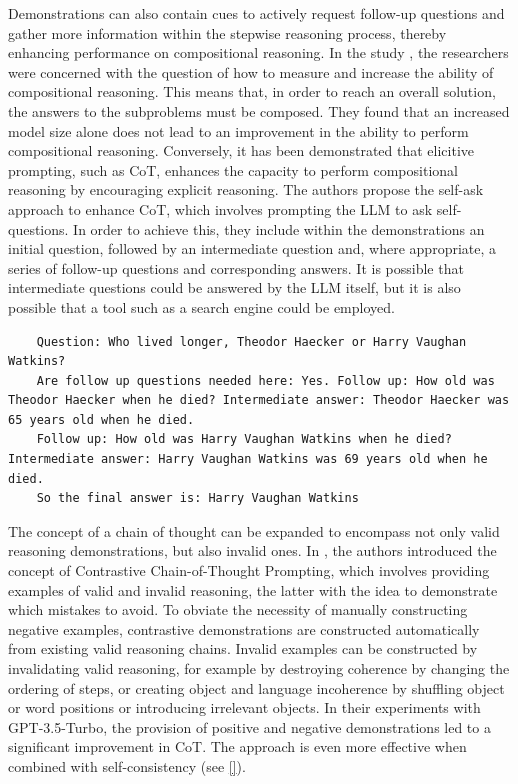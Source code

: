 \documentclass{article}
\begin{document}
Demonstrations can also contain cues to actively request follow-up questions and gather more information within the stepwise reasoning process, thereby enhancing performance on compositional reasoning. 
In the study \cite{press_measuring_2023}, the researchers were concerned with the question of how to measure and increase the ability of compositional reasoning. This means that, in order to reach an overall solution, the answers to the subproblems must be composed. They found that an increased model size alone does not lead to an improvement in the ability to perform compositional reasoning. Conversely, it has been demonstrated that elicitive prompting, such as CoT, enhances the capacity to perform compositional reasoning by encouraging explicit reasoning. The authors propose the self-ask approach to enhance CoT, which involves prompting the LLM to ask self-questions. In order to achieve this, they include within the demonstrations an initial question, followed by an intermediate question and, where appropriate, a series of follow-up questions and corresponding answers. It is possible that intermediate questions could be answered by the LLM itself, but it is also possible that a tool such as a search engine could be employed.
\begin{verbatim}
	Question: Who lived longer, Theodor Haecker or Harry Vaughan Watkins? 
	Are follow up questions needed here: Yes. Follow up: How old was Theodor Haecker when he died? Intermediate answer: Theodor Haecker was 65 years old when he died. 
	Follow up: How old was Harry Vaughan Watkins when he died? Intermediate answer: Harry Vaughan Watkins was 69 years old when he died. 
	So the final answer is: Harry Vaughan Watkins
\end{verbatim}

The concept of a chain of thought can be expanded to encompass not only valid reasoning demonstrations, but also invalid ones. 
In \cite{chia_contrastive_2023}, the authors introduced the concept of Contrastive Chain-of-Thought Prompting, which involves providing examples of valid and invalid reasoning, the latter with the idea to demonstrate which mistakes to avoid. To obviate the necessity of manually constructing negative examples, contrastive demonstrations are constructed automatically from existing valid reasoning chains. Invalid examples can be constructed by invalidating valid reasoning, for example by destroying coherence by changing the ordering of steps, or creating object and language incoherence by shuffling object or word positions or introducing irrelevant objects.
In their experiments with GPT-3.5-Turbo, the provision of positive and negative demonstrations led to a significant improvement in CoT. The approach is even more effective when combined with self-consistency (see \ref{}).
\end{document}
